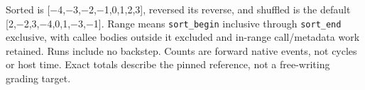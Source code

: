 Sorted is {[}\ensuremath{-}4,\ensuremath{-}3,\ensuremath{-}2,\ensuremath{-}1,0,1,2,3{]}, reversed its reverse, and shuffled
is the default {[}2,\ensuremath{-}2,3,\ensuremath{-}4,0,1,\ensuremath{-}3,\ensuremath{-}1{]}. Range means
\texttt{sort\_begin} inclusive through \texttt{sort\_end} exclusive,
with callee bodies outside it excluded and in-range call/metadata work
retained. Runs include no backstep. Counts are forward native events,
not cycles or host time. Exact totals describe the pinned reference, not
a free-writing grading target.
